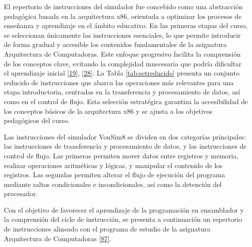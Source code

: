 \documentclass[12pt,oneside]{templates/unerthesis}
\begin{document}
El repertorio de instrucciones del simulador fue concebido como una abstracción pedagógica basada en la arquitectura x86, orientada a optimizar los procesos de enseñanza y aprendizaje en el ámbito educativo. En las primeras etapas del curso, se seleccionan únicamente las instrucciones esenciales, lo que permite introducir de forma gradual y accesible los contenidos fundamentales de la asignatura Arquitectura de Computadoras. Este enfoque progresivo facilita la comprensión de los conceptos clave, evitando la complejidad innecesaria que podría dificultar el aprendizaje inicial \protect\hyperlink{ref-hennessy2017computer}{{[}19{]}}, \protect\hyperlink{ref-tanenbaum_structured_2016}{{[}28{]}}. La Tabla \ref{tab:setreducido} presenta un conjunto reducido de instrucciones que abarca las operaciones más relevantes para una etapa introductoria, centradas en la transferencia y procesamiento de datos, así como en el control de flujo. Esta selección estratégica garantiza la accesibilidad de los conceptos básicos de la arquitectura x86 y se ajusta a los objetivos pedagógicos del curso.

Las instrucciones del simulador VonSim8 se dividen en dos categorías principales: las instrucciones de transferencia y procesamiento de datos, y las instrucciones de control de flujo. Las primeras permiten mover datos entre registros y memoria, realizar operaciones aritméticas y lógicas, y manipular el contenido de los registros. Las segundas permiten alterar el flujo de ejecución del programa mediante saltos condicionales e incondicionales, así como la detención del procesador.

Con el objetivo de favorecer el aprendizaje de la programación en ensamblador y la comprensión del ciclo de instrucción, se presenta a continuación un repertorio de instrucciones alineado con el programa de estudio de la asignatura Arquitectura de Computadoras \protect\hyperlink{ref-cd023_25_programa2025}{{[}87{]}}.
\end{document}
